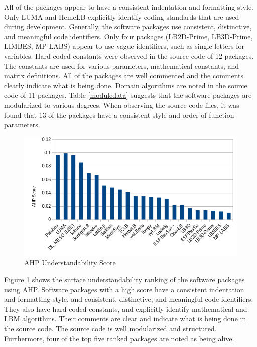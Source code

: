 \documentclass[12pt, notitlepage]{article}
\begin{document}
All of the packages appear to have a consistent indentation and formatting style. Only LUMA and HemeLB explicitly identify coding standards that are used during development. Generally, the software packages use consistent, distinctive, and meaningful code identifiers. Only four packages (LB2D-Prime, LB3D-Prime, LIMBES, MP-LABS) appear to use vague identifiers, such as single letters for variables. Hard coded constants were observed in the source code of 12 packages. The constants are used for various parameters, mathematical constants, and matrix definitions. All of the packages are well commented and the comments clearly indicate what is being done. Domain algorithms are noted in the source code of 11 packages. Table \ref{moduledata} suggests that the software packages are modularized to various degrees. When observing the source code files, it was found that 13 of the packages have a consistent style and order of function parameters.

\begin{figure}[h!]
	\begin{center}
		\includegraphics[width=1.0\textwidth]{understandability_chart}
		\caption{AHP Understandability Score}
		\label{Fig_Understandability}
	\end{center}
\end{figure}

Figure \ref{Fig_Understandability} shows the surface understandability ranking of the software packages using AHP. Software packages with a high score have a consistent indentation and formatting style, and consistent, distinctive, and meaningful code identifiers. They also have hard coded constants, and explicitly identify mathematical and LBM algorithms. Their comments are clear and indicate what is being done in the source code. The source code is well modularized and structured. Furthermore, four of the top five ranked packages are noted as being alive.
\end{document}
